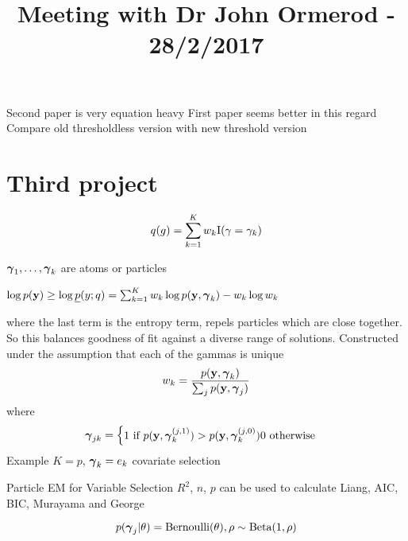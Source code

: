 \documentclass{amsart}
\title{Meeting with Dr John Ormerod - 28/2/2017}
\begin{document}
\maketitle

Second paper is very equation heavy
First paper seems better in this regard
Compare old thresholdless version with new threshold version

\section{Third project}
\[
	q(g) = \sum_{k=1}^K w_k \text{I}(\gamma = \gamma_k)
\]

${\boldsymbol \gamma}_1, \ldots, {\boldsymbol \gamma}_k$ are atoms or particles

$\log p({\bf y}) \geq \log \underline{p}(y; q) = \sum_{k=1}^K w_k \log p({\bf y}, {\boldsymbol \gamma}_k) - w_k \log w_k$

where the last term is the entropy term, repels particles which are close together. So this balances goodness
of fit against a diverse range of solutions.
Constructed under the assumption that each of the gammas is unique
\[
	w_k = \frac{p({\bf y}, {\boldsymbol \gamma}_k)}{\sum_j p({\bf y}, {\boldsymbol \gamma}_j)}
\]
where
\[
	{\boldsymbol \gamma}_{jk} = \begin{cases}
		1 \text{ if } p({\bf y}, {\boldsymbol \gamma}_k^{(j, 1)}) > p({\bf y}, {\boldsymbol \gamma}_k^{(j, 0)})
		0 \text{ otherwise}
	\end{cases}
\]
Example $K = p$, ${\boldsymbol \gamma}_k = e_k$ covariate selection

Particle EM for Variable Selection
$R^2$, $n$, $p$ can be used to calculate Liang, AIC, BIC, Murayama and George

\[
	p({\boldsymbol \gamma}_j | \theta) = \text{Bernoulli}(\theta), \rho \sim \text{Beta}(1, \rho)
\]
\end{document}
